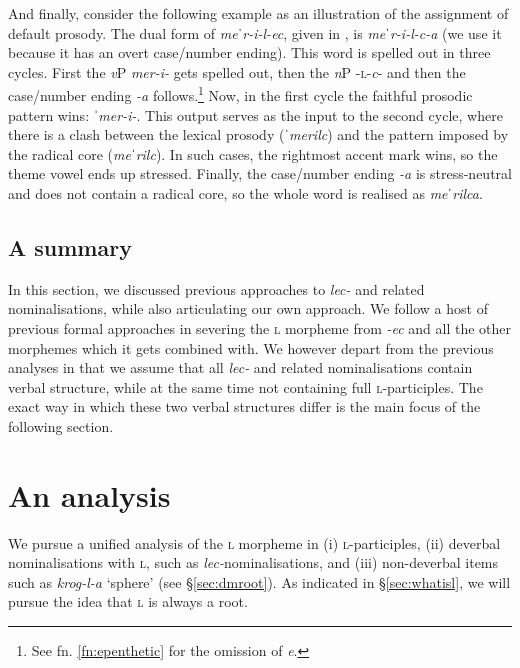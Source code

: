 \documentclass[output=paper,colorlinks,citecolor=brown]{langscibook}
\begin{document}
And finally, consider the following example as an illustration of the assignment of default prosody. The dual form of \textit{meˈr-i-l-ec}, given in , is \textit{meˈr-i-l-c-a} (we use it because it has an overt case/number ending). This word is spelled out in three cycles. First the \textit{v}P \textit{mer-i-} gets spelled out, then the \textit{n}P -\textsc{l}-\textit{c}- and then the case/number ending \textit{-a} follows.\footnote{See fn. \ref{fn:epenthetic} for the omission of \textit{e}.} Now, in the first cycle the faithful prosodic pattern wins: \textit{ˈmer-i-}. This output serves as the input to the second cycle, where there is a clash between the lexical prosody (\textit{ˈmerilc}) and the pattern imposed by the radical core (\textit{meˈrilc}). In such cases, the rightmost accent mark wins, so the theme vowel ends up stressed. Finally, the case/number ending \textit{-a} is stress-neutral and does not contain a radical core, so the whole word is realised as \textit{meˈrilca}.


\subsection{A summary}

In this section, we discussed previous approaches to \textit{lec-} and related nominalisations, while also 
articulating our own approach. We follow a host of previous formal approaches in severing the \textsc{l} morpheme from \textit{-ec} and all the other morphemes which it gets combined with. We however depart from the previous analyses in that we assume that all \textit{lec-} and related nominalisations contain verbal structure, while at the same time not containing full \textsc{l}-participles. The exact way in which these two verbal structures differ is the main focus of the following section.


\section{An analysis \label{sec:analysisnew}}
We pursue a unified analysis of the \textsc{l} morpheme in (i) \textsc{l}-participles, (ii) deverbal nominalisations with \textsc{l}, such as \textit{lec-}nominalisations, and (iii) non-deverbal items such as \textit{krog-l-a} `sphere' (see \S \ref{sec:dmroot}). As indicated in \S \ref{sec:whatisl}, we will pursue the idea that \textsc{l} is always a root. 
\end{document}
